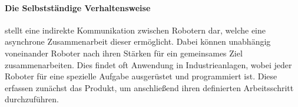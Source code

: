 \paragraph{Die Selbstständige Verhaltensweise} stellt eine indirekte Kommunikation zwischen Robotern dar, welche eine asynchrone Zusammenarbeit dieser ermöglicht. Dabei können unabhängig voneinander Roboter nach ihren Stärken für ein gemeinsames Ziel zusammenarbeiten. Dies findet oft Anwendung in Industrieanlagen, wobei jeder Roboter für eine spezielle Aufgabe ausgerüstet und programmiert ist. Diese erfassen zunächst das Produkt, um anschließend ihren definierten Arbeitsschritt durchzuführen.
